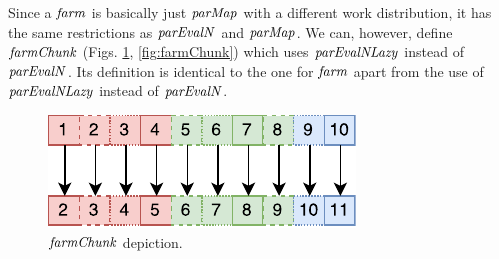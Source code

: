 \documentclass[paper=A4,twoside=true,openright,parskip=full,chapterprefix=true,headings=normal,bibliography=totoc,listof=totoc,titlepage=on,captions=tableabove,draft=false,british]{scrreprt}%
\begin{document}
Since a \ensuremath{\Varid{farm}} is basically just \ensuremath{\Varid{parMap}} with a different work
distribution, it has the same restrictions as \ensuremath{\Varid{parEvalN}} and \ensuremath{\Varid{parMap}}.
We can, however, define \ensuremath{\Varid{farmChunk}} (Figs. \ref{fig:farmChunkImg}, \ref{fig:farmChunk})
which uses \ensuremath{\Varid{parEvalNLazy}} instead of \ensuremath{\Varid{parEvalN}}.
Its definition is identical to the one for \ensuremath{\Varid{farm}} apart from the use of
\ensuremath{\Varid{parEvalNLazy}} instead of \ensuremath{\Varid{parEvalN}}.

\begin{figure}
\centering
\includegraphics{src/img/farmChunkImg.pdf}
\caption{\ensuremath{\Varid{farmChunk}} depiction.\label{fig:farmChunkImg}}
\end{figure}
\end{document}
